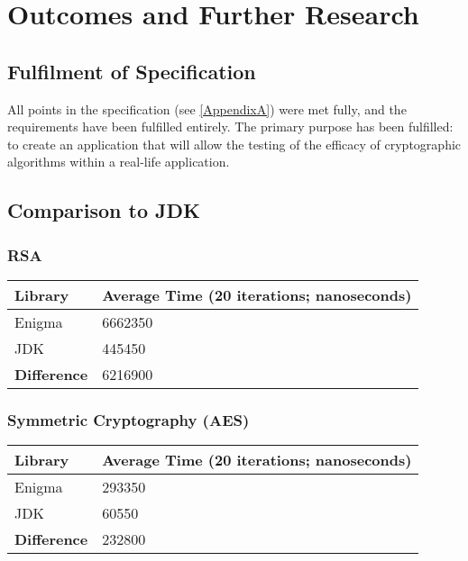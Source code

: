 
\chapter{Outcomes and Further Research} 
\label{Chapter7}

\section{Fulfilment of Specification}

All points in the specification (see \textsection\ref{AppendixA}) were met fully, and the requirements have been fulfilled entirely. The primary purpose has been fulfilled: to create an application that will allow the testing of the efficacy of cryptographic algorithms within a real-life application.

\section{Comparison to JDK}

  \subsection{RSA}
  
    \begin{center}
      \begin{tabular}{ | l | p{4.0cm} |}
        \hline
        Library & Average Time (20 iterations; nanoseconds) \\ \hline \hline
        Enigma & 6662350 \\ \hline
        JDK & 445450 \\ \hline \hline
        \textbf{Difference} & 6216900 \\
        \hline
      \end{tabular}
    \end{center}
  
  \subsection{Symmetric Cryptography (AES)}
  
    \begin{center}
      \begin{tabular}{ | l | p{4.0cm} |}
        \hline
        Library & Average Time (20 iterations; nanoseconds) \\ \hline \hline
        Enigma & 293350 \\ \hline
        JDK & 60550 \\ \hline \hline
        \textbf{Difference} & 232800 \\
        \hline
      \end{tabular}
    \end{center}
    
